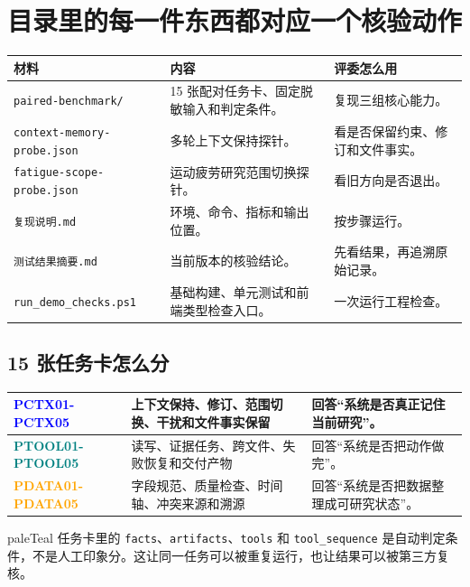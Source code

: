 \documentclass[UTF8,11pt,a4paper]{ctexart}
\begin{document}
\section*{目录里的每一件东西都对应一个核验动作}
\begin{tabularx}{\textwidth}{@{}p{45mm} X p{30mm}@{}}
\toprule
\textbf{材料} & \textbf{内容} & \textbf{评委怎么用}\\
\midrule
\texttt{paired-benchmark/} & 15 张配对任务卡、固定脱敏输入和判定条件。 & 复现三组核心能力。\\
\texttt{context-memory-probe.json} & 多轮上下文保持探针。 & 看是否保留约束、修订和文件事实。\\
\texttt{fatigue-scope-probe.json} & 运动疲劳研究范围切换探针。 & 看旧方向是否退出。\\
\texttt{复现说明.md} & 环境、命令、指标和输出位置。 & 按步骤运行。\\
\texttt{测试结果摘要.md} & 当前版本的核验结论。 & 先看结果，再追溯原始记录。\\
\texttt{run\_demo\_checks.ps1} & 基础构建、单元测试和前端类型检查入口。 & 一次运行工程检查。\\
\bottomrule
\end{tabularx}

\subsection*{15 张任务卡怎么分}
\begin{tabularx}{\textwidth}{@{}p{27mm} X X@{}}
\toprule
\textcolor{blue}{\textbf{PCTX01-PCTX05}} & 上下文保持、修订、范围切换、干扰和文件事实保留 & 回答“系统是否真正记住当前研究”。\\
\midrule
\textcolor{teal}{\textbf{PTOOL01-PTOOL05}} & 读写、证据任务、跨文件、失败恢复和交付产物 & 回答“系统是否把动作做完”。\\
\midrule
\textcolor{orange}{\textbf{PDATA01-PDATA05}} & 字段规范、质量检查、时间轴、冲突来源和溯源 & 回答“系统是否把数据整理成可研究状态”。\\
\bottomrule
\end{tabularx}

\vspace{6mm}
\begin{card}[colframe=teal]{paleTeal}
任务卡里的 \texttt{facts}、\texttt{artifacts}、\texttt{tools} 和 \texttt{tool\_sequence} 是自动判定条件，不是人工印象分。这让同一任务可以被重复运行，也让结果可以被第三方复核。
\end{card}
\clearpage
\end{document}
